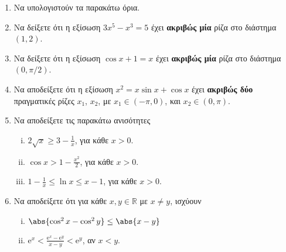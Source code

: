 \begin{enumerate}
  \item Να υπολογιστούν τα παρακάτω όρια.
    \begin{enumerate}[(i)]
    \end{enumerate}

  \item Να δείξετε ότι η εξίσωση $ 3x^{5}-x^{3}=5 $ έχει \textbf{ακριβώς μία} 
    ρίζα στο διάστημα $ (1,2) $.
  \item Να δείξετε ότι η εξίσωση $ \cos{x} + 1 = x $ έχει \textbf{ακριβώς μία} 
    ρίζα στο διάστημα $ (0, \pi/2) $. 

  \item Να αποδείξετε ότι η εξίσωση 
    $ x^{2} = x \sin{x} + \cos{x} $ έχει \textbf{ακριβώς δύο} πραγματικές ρίζες 
    $ x_{1} $, $ x_{2} $, με $ x_{1} \in (-\pi, 0) $, και $x_{2} \in (0, \pi) $.

  \item Να αποδείξετε τις παρακάτω ανισότητες
    \begin{enumerate}[i)]
      \item $ 2 \sqrt{x} \geq 3 - \frac{1}{x} $, για κάθε $ x>0 $.
      \item $ \cos{x} > 1 - \frac{x^{2}}{2} $, για κάθε $ x>0 $.
      \item $ 1- \frac{1}{x} \leq \ln{x} \leq x-1 $, για κάθε $ x>0 $.
    \end{enumerate}

  \item Να αποδείξετε ότι για κάθε $x,y \in \mathbb{R}$ με $ x \neq y $, ισχύουν 
    \begin{enumerate}[i)]
      \item $ \abs{ \cos^{2}{x} - \cos^{2}{y}} \leq \abs{x-y} $ 
      \item $ \mathrm{e}^{x} < \frac{\mathrm{e}^{x} - \mathrm{e}^{y}}{x-y} <
        \mathrm{e}^{y} $, αν $ x<y $.
    \end{enumerate}


\end{enumerate}
